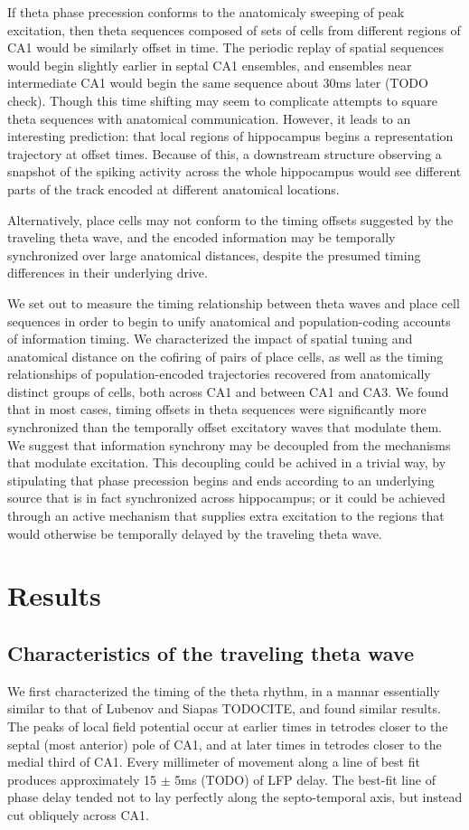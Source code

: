 \documentclass[10pt]{article}
\begin{document}
If theta phase precession conforms to the anatomicaly sweeping of peak excitation, then theta sequences composed of sets of cells from different regions of CA1 would be similarly offset in time. The periodic replay of spatial sequences would begin slightly earlier in septal CA1 ensembles, and ensembles near intermediate CA1 would begin the same sequence about 30ms later (TODO check). Though this time shifting may seem to complicate attempts to square theta sequences with anatomical communication. However, it leads to an interesting prediction: that local regions of hippocampus begins a representation trajectory at offset times. Because of this, a downstream structure observing a snapshot of the spiking activity across the whole hippocampus would see different parts of the track encoded at different anatomical locations.

Alternatively, place cells may not conform to the timing offsets suggested by the traveling theta wave, and the encoded information may be temporally synchronized over large anatomical distances, despite the presumed timing differences in their underlying drive.

We set out to measure the timing relationship between theta waves and place cell sequences in order to begin to unify anatomical and population-coding accounts of information timing. We characterized the impact of spatial tuning and anatomical distance on the cofiring of pairs of place cells, as well as the timing relationships of population-encoded trajectories recovered from anatomically distinct groups of cells, both across CA1 and between CA1 and CA3. We found that in most cases, timing offsets in theta sequences were significantly more synchronized than the temporally offset excitatory waves that modulate them. We suggest that information synchrony may be decoupled from the mechanisms that modulate excitation. This decoupling could be achived in a trivial way, by stipulating that phase precession begins and ends according to an underlying source that is in fact synchronized across hippocampus; or it could be achieved through an active mechanism that supplies extra excitation to the regions that would otherwise be temporally delayed by the traveling theta wave.

\section*{Results}

\subsection*{Characteristics of the traveling theta wave}
We first characterized the timing of the theta rhythm, in a mannar essentially similar to that of Lubenov and Siapas TODOCITE, and found similar results. The peaks of local field potential occur at earlier times in tetrodes closer to the septal (most anterior) pole of CA1, and at later times in tetrodes closer to the medial third of CA1. Every millimeter of movement along a line of best fit produces approximately 15 $\pm$ 5ms (TODO) of LFP delay. The best-fit line of phase delay tended not to lay perfectly along the septo-temporal axis, but instead cut obliquely across CA1. 
\end{document}
